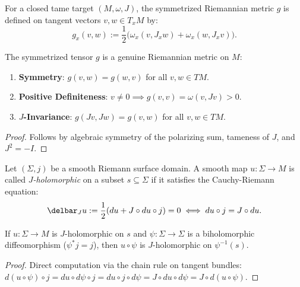 \begin{definition}
\label{def:symmetrized_metric}
\leanok
For a closed tame target $(M, \omega, J)$, the symmetrized Riemannian metric $g$ is defined on tangent vectors $v, w \in T_x M$ by:
\[
g_x(v, w) := \frac{1}{2}\big(\omega_x(v, J_x w) + \omega_x(w, J_x v)\big).
\]
\end{definition}

\begin{theorem}
\label{thm:metric_pos_def}
\leanok
{}
The symmetrized tensor $g$ is a genuine Riemannian metric on $M$:
\begin{enumerate}
\item \textbf{Symmetry}: $g(v, w) = g(w, v)$ for all $v, w \in TM$.
\item \textbf{Positive Definiteness}: $v \neq 0 \implies g(v, v) = \omega(v, Jv) > 0$.
\item \textbf{$J$-Invariance}: $g(Jv, Jw) = g(v, w)$ for all $v, w \in TM$.
\end{enumerate}
\end{theorem}
\begin{proof}
\leanok
Follows by algebraic symmetry of the polarizing sum, tameness of $J$, and $J^2 = -I$.
\end{proof}

\begin{definition}
\label{def:j_holomorphic}
\leanok
{}
Let $(\Sigma, j)$ be a smooth Riemann surface domain. A smooth map $u : \Sigma \to M$ is called \emph{$J$-holomorphic} on a subset $s \subseteq \Sigma$ if it satisfies the Cauchy-Riemann equation:
\[
\delbar_J u := \frac{1}{2}(du + J \circ du \circ j) = 0 \iff du \circ j = J \circ du.
\]
\end{definition}

\begin{theorem}
\label{thm:jhol_coordinate_invariance}
\leanok
{}
If $u : \Sigma \to M$ is $J$-holomorphic on $s$ and $\psi : \Sigma \to \Sigma$ is a biholomorphic diffeomorphism ($\psi^* j = j$), then $u \circ \psi$ is $J$-holomorphic on $\psi^{-1}(s)$.
\end{theorem}
\begin{proof}
\leanok
Direct computation via the chain rule on tangent bundles: $d(u \circ \psi) \circ j = du \circ d\psi \circ j = du \circ j \circ d\psi = J \circ du \circ d\psi = J \circ d(u \circ \psi)$.
\end{proof}

